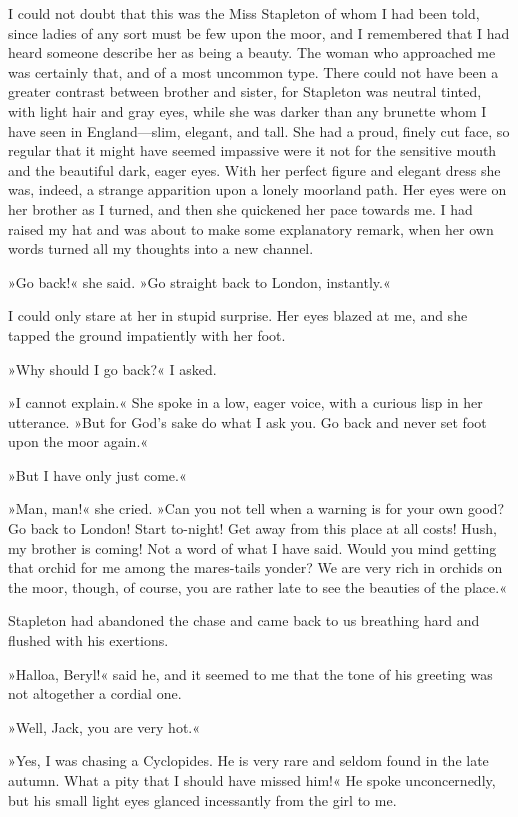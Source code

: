 I could not doubt that this was the Miss Stapleton of whom I had been told, since ladies of any sort must be few upon the moor, and I remembered that I had heard someone describe her as being a beauty. The woman who approached me was certainly that, and of a most uncommon type. There could not have been a greater contrast between brother and sister, for Stapleton was neutral tinted, with light hair and gray eyes, while she was darker than any brunette whom I have seen in England—slim, elegant, and tall. She had a proud, finely cut face, so regular that it might have seemed impassive were it not for the sensitive mouth and the beautiful dark, eager eyes. With her perfect figure and elegant dress she was, indeed, a strange apparition upon a lonely moorland path. Her eyes were on her brother as I turned, and then she quickened her pace towards me. I had raised my hat and was about to make some explanatory remark, when her own words turned all my thoughts into a new channel.

»Go back!« she said. »Go straight back to London, instantly.«

I could only stare at her in stupid surprise. Her eyes blazed at me, and she tapped the ground impatiently with her foot.

»Why should I go back?« I asked.

»I cannot explain.« She spoke in a low, eager voice, with a curious lisp in her utterance. »But for God's sake do what I ask you. Go back and never set foot upon the moor again.«

»But I have only just come.«

»Man, man!« she cried. »Can you not tell when a warning is for your own good? Go back to London! Start to-night! Get away from this place at all costs! Hush, my brother is coming! Not a word of what I have said. Would you mind getting that orchid for me among the mares-tails yonder? We are very rich in orchids on the moor, though, of course, you are rather late to see the beauties of the place.«

Stapleton had abandoned the chase and came back to us breathing hard and flushed with his exertions.

»Halloa, Beryl!« said he, and it seemed to me that the tone of his greeting was not altogether a cordial one.

»Well, Jack, you are very hot.«

»Yes, I was chasing a Cyclopides. He is very rare and seldom found in the late autumn. What a pity that I should have missed him!« He spoke unconcernedly, but his small light eyes glanced incessantly from the girl to me.

